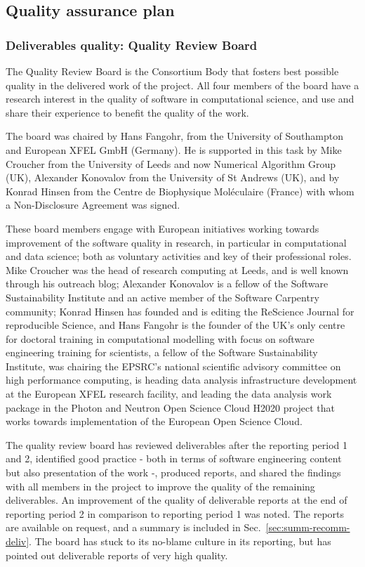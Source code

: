 \subsection{Quality assurance plan}
\label{section.QAP}

\subsubsection{Deliverables quality: Quality Review Board}

The Quality Review Board is the Consortium Body that fosters best
possible quality in the delivered work of the project.
All four members of the board
have a research interest in the quality of software in computational
science, and use and share their experience to benefit the quality of
the work.

The board was chaired by Hans Fangohr, from the University of
Southampton and European XFEL GmbH (Germany). He is supported in this task by
Mike Croucher from the University of Leeds and now
Numerical Algorithm Group (UK), Alexander Konovalov from
the University of St Andrews (UK), and by Konrad Hinsen from the Centre de
Biophysique Moléculaire (France) with whom a Non-Disclosure Agreement was
signed.

These board members engage with European initiatives working towards
improvement of the software quality in research, in particular in
computational and data science; both as voluntary activities and key
of their professional roles. Mike Croucher was the head of research
computing at Leeds, and is well known through his outreach blog; Alexander Konovalov
is a fellow of the Software Sustainability Institute and an active
member of the Software Carpentry community; Konrad Hinsen has
founded and is editing the ReScience Journal for reproducible Science,
and Hans Fangohr is the founder of the UK's only centre for
doctoral training in computational modelling with focus on software
engineering training for scientists, a fellow of the Software
Sustainability Institute, was chairing the EPSRC's national scientific
advisory committee on high performance computing, is heading
data analysis infrastructure development at the European XFEL research
facility, and leading the data analysis work package in the Photon and
Neutron Open Science Cloud H2020 project that works towards
implementation of the European Open Science Cloud.

The quality review board has reviewed deliverables after the reporting
period 1 and 2, identified good practice - both in terms of software
engineering content but also presentation of the work -, produced
reports, and shared the findings with all members in the project to
improve the quality of the remaining deliverables. An improvement of
the quality of deliverable reports at the end of reporting period 2 in
comparison to reporting period 1 was noted. The reports are available
on request, and a summary is included in
Sec.~\ref{sec:summ-recomm-deliv}. The board has stuck to its no-blame
culture in its reporting, but has pointed out deliverable reports of
very high quality.



